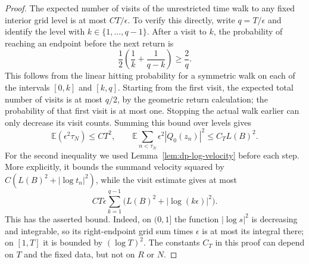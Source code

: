 \documentclass[11pt]{article}
\numberwithin{equation}{section}
\theoremstyle{definition}
\theoremstyle{remark}
\begin{document}
\begin{proof}
The expected number of visits of the unrestricted time walk to any fixed
interior grid level is at most $CT/\epsilon$. To verify this directly,
write $q=T/\epsilon$ and identify the level with $k\in\{1,\ldots,q-1\}$.
After a visit to $k$, the
probability of reaching an endpoint before the next return is
\[
  \frac12\left(\frac1k+\frac1{q-k}\right)\ge\frac2q.
\]
This follows from the linear hitting probability for a symmetric walk on
each of the intervals $[0,k]$ and $[k,q]$. Starting from the first visit,
the expected total number of visits is at most $q/2$, by the geometric
return calculation; the probability of that first visit is at most one.
Stopping the actual walk earlier can only decrease its visit counts.
Summing this bound over levels gives
\begin{equation}\label{eq:contact-time-and-velocity-budget}
  \mathbb E(\epsilon^2\tau_N)\le CT^2,\qquad
  \mathbb E\sum_{n<\tau_N}\epsilon^2|Q_0(z_n)|^2
       \le C_T L(B)^2.
\end{equation}
For the second inequality we used Lemma~\ref{lem:dp-log-velocity} before
each step.  More explicitly, it bounds the summand velocity squared by
$C(L(B)^2+|\log t_n|^2)$, while the visit estimate gives at most
\[
  CT\epsilon\sum_{k=1}^{q-1}
           \bigl(L(B)^2+|\log(k\epsilon)|^2\bigr).
\]
This has the asserted bound.  Indeed, on $(0,1]$ the function
$|\log s|^2$ is decreasing and integrable, so its right-endpoint grid sum
times $\epsilon$ is at most its integral there; on $[1,T]$ it is bounded by
$(\log T)^2$.  The constants $C_T$ in this proof can depend on $T$ and the
fixed data, but not on $R$ or $N$.


\end{proof}
\end{document}
